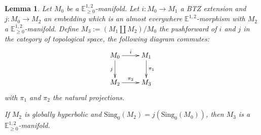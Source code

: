 \documentclass[a4paper,12pt]{article}
\def\sing{\mathrm{Sing}}
\newcommand{\mass}[1]{{\mathbb E}^{1,2}_{#1}}
\newtheorem{lemou}{Lemma}[section]          %
\begin{document}
	\begin{lemou} \label{lem:extension_hausdorff}
	Let $M_0$ be a $\mass{\geq0}$-manifold. 	
					Let $i:M_0\rightarrow M_1$ a BTZ extension and $j:M_0\rightarrow M_2$ an embedding which is an almost everywhere $\mass{}$-morphism  with $M_2$ a $\mass{\geq0}$-manifold.
					Define $M_3:=(M_1\coprod M_2)/M_0$ the pushforward of $i$ and $j$ in the category of topological space, the following diagram commutes:
						$$\xymatrix{
							M_0 \ar[r]^{i}\ar[d]_j & M_1\ar[d]^{\pi_1} \\
							M_2\ar[r]^{\pi_2}& M_3
							}$$
			with $\pi_1$ and $\pi_2$ the natural projections.
			
					If $M_2$ is globally hyperbolic and $\sing_0(M_2)=j(\sing_0(M_0))$, then $M_3$ is a $\mass{\geq0}$-manifold.
	
					\end{lemou}
\end{document}
